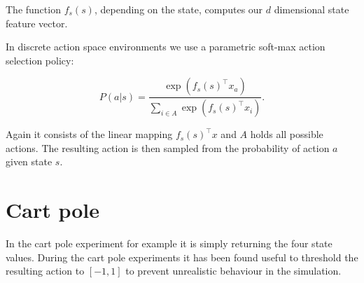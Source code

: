 The function $f_s(s)$, depending on the state, computes our $d$ dimensional state feature vector.

In discrete action space environments we use a parametric soft-max action selection policy:

$$P(a|s)= \frac{\exp(f_s(s)^\top x_a)}{\sum_{i\in A} \exp(f_s(s)^\top x_i)}.$$

Again it consists of the linear mapping $f_s(s)^\top x$ and $A$ holds all possible actions. The resulting action is then sampled from the probability of action $a$ given state $s$.


\section{Cart pole}
In the cart pole experiment for example it is simply returning the four state values. During the cart pole experiments it has been found useful to threshold the resulting action to $[-1,1]$ to prevent unrealistic behaviour in the simulation.

